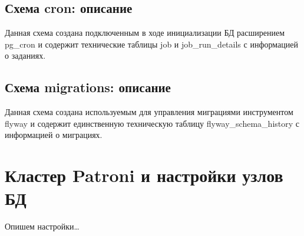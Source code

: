 \documentclass[a4paper,12pt]{article}
\begin{document}
    \subsection{Схема cron: описание}
    Данная схема создана подключенным в ходе инициализации БД расширением pg\_cron и содержит технические таблицы
    job и job\_run\_details с информацией о заданиях.

    \subsection{Схема migrations: описание}
    Данная схема создана используемым для управления миграциями инструментом flyway и содержит
    единственную техническую таблицу flyway\_schema\_history с информацией о миграциях.
    
    \section{Кластер Patroni и настройки узлов БД}
    Опишем настройки\ldots
\end{document}
